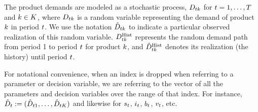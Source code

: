 \documentclass[msom]{oo}
\begin{document}
The product demands are modeled as a stochastic process, $D_{t k}$ for $t=1,\ldots,T$ and $k \in K$, where $D_{t k}$ is a random variable representing the demand of product $k$ in period $t$. We use the notation $\hat{D}_{t k}$ to indicate a particular observed realization of this random variable.
$D^\text{Hist}_{t k}$ represents the random demand path from period 1 to period $t$ for product $k$, and $\hat{D}^\text{Hist}_{tk}$ denotes its realization (the history) until period $t$.

For notational convenience, when an index is dropped when referring to a parameter or decision variable, we are referring to the vector of all the parameters and decision variables over the range of that index. For instance,  $\hat{D}_{t} := (\hat{D}_{t 1}, \ldots, \hat{D}_{t K})$ and likewise for ${s}_{t}$, $i_{t}$, ${b}_{t}$, $v_{t}$, etc.
\end{document}
